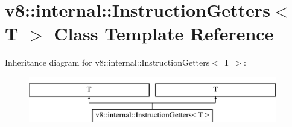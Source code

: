 \hypertarget{classv8_1_1internal_1_1InstructionGetters}{}\section{v8\+:\+:internal\+:\+:Instruction\+Getters$<$ T $>$ Class Template Reference}
\label{classv8_1_1internal_1_1InstructionGetters}
Inheritance diagram for v8\+:\+:internal\+:\+:Instruction\+Getters$<$ T $>$\+:\begin{figure}[H]
\begin{center}
\leavevmode
\includegraphics[height=2.000000cm]{classv8_1_1internal_1_1InstructionGetters}
\end{center}
\end{figure}
